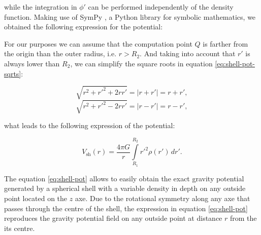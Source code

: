 \documentclass[extra]{gji}
\begin{document}
\noindent while the integration in $\phi'$ can be performed independently of the density function.
Making use of SymPy \citep{sympy2017}, a Python library for symbolic mathematics, we obtained the following expression for the potential:


For our purposes we can assume that the computation point $Q$ is farther from the origin than the outer radius, i.e. $r>R_2$. 
And taking into account that $r'$ is always lower than $R_2$, we can simplify the square roots in equation \ref{eq:shell-pot-sqrts}:

\begin{equation}
    \sqrt{r^2 + r'^2 + 2rr'} = |r + r'| = r + r',
\end{equation}
\begin{equation}
    \sqrt{r^2 + r'^2 - 2rr'} = |r - r'| = r - r',
\end{equation}

\noindent what leads to the following expression of the potential:

\begin{equation}
    V_\text{sh}(r) = \frac{4\pi G}{r}
    \int\limits_{R_1}^{R_2} {r'}^2 \rho(r') \, dr'.
\label{eq:shell-pot}
\end{equation}

The equation \ref{eq:shell-pot} allows to easily obtain the exact gravity potential generated by a spherical shell with a variable density in depth on any outside point located on the $z$ axe.
Due to the rotational symmetry along any axe that passes through the centre of the shell, the expression in equation \ref{eq:shell-pot} reproduces the gravity potential field on any outside point at distance $r$ from the its centre.
\end{document}
